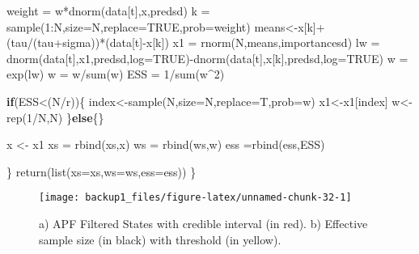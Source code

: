 \documentclass[
]{book}
\newenvironment{Shaded}{\begin{snugshade}}{\end{snugshade}}
\newcommand{\AttributeTok}[1]{\textcolor[rgb]{0.77,0.63,0.00}{#1}}
\newcommand{\ConstantTok}[1]{\textcolor[rgb]{0.00,0.00,0.00}{#1}}
\newcommand{\ControlFlowTok}[1]{\textcolor[rgb]{0.13,0.29,0.53}{\textbf{#1}}}
\newcommand{\DecValTok}[1]{\textcolor[rgb]{0.00,0.00,0.81}{#1}}
\newcommand{\FunctionTok}[1]{\textcolor[rgb]{0.00,0.00,0.00}{#1}}
\newcommand{\NormalTok}[1]{#1}
\newcommand{\OtherTok}[1]{\textcolor[rgb]{0.56,0.35,0.01}{#1}}
\newcommand{\SpecialCharTok}[1]{\textcolor[rgb]{0.00,0.00,0.00}{#1}}
\theoremstyle{break}
\theoremstyle{nonumberplain}
\begin{document}
\begin{Shaded}
\begin{Highlighting}[]
\NormalTok{    weight }\OtherTok{=}\NormalTok{ w}\SpecialCharTok{*}\FunctionTok{dnorm}\NormalTok{(data[t],x,predsd)}
\NormalTok{    k   }\OtherTok{=} \FunctionTok{sample}\NormalTok{(}\DecValTok{1}\SpecialCharTok{:}\NormalTok{N,}\AttributeTok{size=}\NormalTok{N,}\AttributeTok{replace=}\ConstantTok{TRUE}\NormalTok{,}\AttributeTok{prob=}\NormalTok{weight)}
\NormalTok{    means}\OtherTok{\textless{}{-}}\NormalTok{x[k]}\SpecialCharTok{+}\NormalTok{(tau}\SpecialCharTok{/}\NormalTok{(tau}\SpecialCharTok{+}\NormalTok{sigma))}\SpecialCharTok{*}\NormalTok{(data[t]}\SpecialCharTok{{-}}\NormalTok{x[k])}
\NormalTok{    x1   }\OtherTok{=} \FunctionTok{rnorm}\NormalTok{(N,means,importancesd)}
\NormalTok{    lw  }\OtherTok{=} \FunctionTok{dnorm}\NormalTok{(data[t],x1,predsd,}\AttributeTok{log=}\ConstantTok{TRUE}\NormalTok{)}\SpecialCharTok{{-}}\FunctionTok{dnorm}\NormalTok{(data[t],x[k],predsd,}\AttributeTok{log=}\ConstantTok{TRUE}\NormalTok{)}
\NormalTok{    w   }\OtherTok{=} \FunctionTok{exp}\NormalTok{(lw)}
\NormalTok{    w   }\OtherTok{=}\NormalTok{ w}\SpecialCharTok{/}\FunctionTok{sum}\NormalTok{(w)}
\NormalTok{    ESS  }\OtherTok{=} \DecValTok{1}\SpecialCharTok{/}\FunctionTok{sum}\NormalTok{(w}\SpecialCharTok{\^{}}\DecValTok{2}\NormalTok{)}
    
    \ControlFlowTok{if}\NormalTok{(ESS}\SpecialCharTok{\textless{}}\NormalTok{(N}\SpecialCharTok{/}\NormalTok{r))\{}
\NormalTok{      index}\OtherTok{\textless{}{-}}\FunctionTok{sample}\NormalTok{(N,}\AttributeTok{size=}\NormalTok{N,}\AttributeTok{replace=}\NormalTok{T,}\AttributeTok{prob=}\NormalTok{w)}
\NormalTok{      x1}\OtherTok{\textless{}{-}}\NormalTok{x1[index]}
\NormalTok{      w}\OtherTok{\textless{}{-}}\FunctionTok{rep}\NormalTok{(}\DecValTok{1}\SpecialCharTok{/}\NormalTok{N,N)}
\NormalTok{    \}}\ControlFlowTok{else}\NormalTok{\{\}}
    
\NormalTok{    x }\OtherTok{\textless{}{-}}\NormalTok{ x1}
\NormalTok{    xs }\OtherTok{=} \FunctionTok{rbind}\NormalTok{(xs,x)}
\NormalTok{    ws }\OtherTok{=} \FunctionTok{rbind}\NormalTok{(ws,w)}
\NormalTok{    ess }\OtherTok{=}\FunctionTok{rbind}\NormalTok{(ess,ESS)}

\NormalTok{  \}}
  \FunctionTok{return}\NormalTok{(}\FunctionTok{list}\NormalTok{(}\AttributeTok{xs=}\NormalTok{xs,}\AttributeTok{ws=}\NormalTok{ws,}\AttributeTok{ess=}\NormalTok{ess))}
\NormalTok{\}}
\end{Highlighting}
\end{Shaded}

\begin{figure}[H]

{\centering \texttt{[image: backup1\_files/figure-latex/unnamed-chunk-32-1]} 

}

\caption{a) APF Filtered States with credible interval (in red). b) Effective sample size (in black) with threshold (in yellow).}\label{fig:unnamed-chunk-32}
\end{figure}
\end{document}
